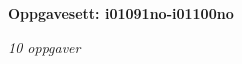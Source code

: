 \centerline{\bf Oppgavesett: i01091no-i01100no}
\vskip 10pt
\centerline{\it 10 oppgaver}\vskip 10pt
\vskip 10pt
